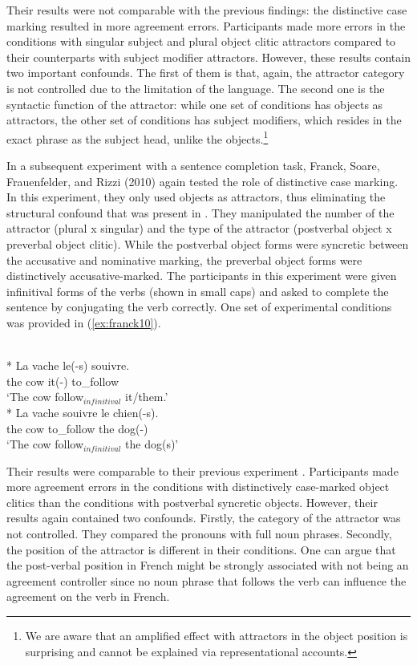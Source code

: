 Their results were not comparable with the previous findings: the distinctive case marking resulted in more agreement errors. Participants made more errors in the conditions with singular subject and plural object clitic attractors compared to their counterparts with subject modifier attractors. However, these results contain two important confounds. The first of them is that, again, the attractor category is not controlled due to the limitation of the language. The second one is the syntactic function of the attractor: while one set of conditions has objects as attractors, the other set of conditions has subject modifiers, which resides in the exact phrase as the subject head, unlike the objects.\footnote{We are aware that an amplified effect with attractors in the object position is surprising and cannot be explained via representational accounts.}

In a subsequent experiment with a sentence completion task, Franck, Soare, Frauenfelder, and Rizzi (2010) again tested the role of distinctive case marking. In this experiment, they only used objects as attractors, thus eliminating the structural confound that was present in . They manipulated the number of the attractor (plural x singular) and the type of the attractor (postverbal object x preverbal object clitic). While the postverbal object forms were syncretic between the accusative and nominative marking, the preverbal object forms were distinctively accusative-marked. The participants in this experiment were given infinitival forms of the verbs (shown in small caps) and asked to complete the sentence by conjugating the verb correctly. One set of experimental conditions was provided in (\ref{ex:franck10}).

\ea \label{ex:franck10}
  \\*
    \gll La vache le(-s) {souivre}.\\
    the cow it(-\Pl) to\_follow\\
    \glt `The cow follow$_{infinitival}$ it/them.' 
  \\*
    \gll La {vache} {souivre} le {chien(-s)}.\\
    the cow to\_follow the dog(-\Pl)\\
    \glt `The cow follow$_{infinitival}$ the dog(s)' 
  \z
\z

Their results were comparable to their previous experiment \citep{FranckEtAl2006}. Participants made more agreement errors in the conditions with distinctively case-marked object clitics than the conditions with postverbal syncretic objects. However, their results again contained two confounds. Firstly, the category of the attractor was not controlled. They compared the pronouns with full noun phrases. Secondly, the position of the attractor is different in their conditions. One can argue that the post-verbal position in French might be strongly associated with not being an agreement controller since no noun phrase that follows the verb can influence the agreement on the verb in French. 

